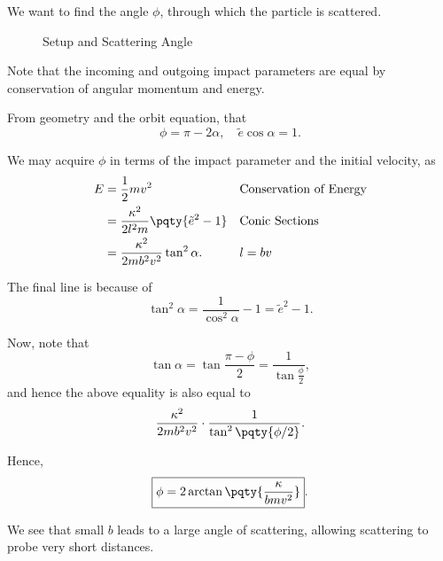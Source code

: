 We want to find the angle \(\phi\), through which the particle is scattered.

\begin{figure}[ht!]
    \centering

    \caption{Setup and Scattering Angle}
    \label{fig:setup-scattering-angle}%
\end{figure}

Note that the incoming and outgoing impact parameters are equal by conservation of angular momentum and energy.

\begin{example}
    \label{ex:angle-of-scattering-repulsive}%
    From geometry and the orbit equation, that
    \begin{equation}
        \phi = \pi - 2\alpha, \quad \tilde{e} \cos \alpha = 1.
    \end{equation}
    
    We may acquire \(\phi\) in terms of the impact parameter and the initial velocity, as
    \begin{subequations}\begin{align}
        E &= \frac{1}{2} m v^2 && \text{Conservation of Energy}\\
        &= \frac{\kappa^2}{2 l^2 m} \pqty{\tilde{e}^2 - 1} && \text{Conic Sections} \\
        &= \frac{\kappa^2}{2 m b^2 v^2} \tan^2 \alpha. && l = bv    
    \end{align}\end{subequations}
    
    The final line is because of
    \begin{equation}
        \tan^2 \alpha = \frac{1}{\cos^2 \alpha} - 1 = \tilde{e}^2 - 1.
    \end{equation}
    
    Now, note that
    \begin{equation}
        \tan \alpha = \tan \frac{\pi - \phi}{2} = \frac{1}{\tan \frac{\phi}{2}},
    \end{equation}
    and hence the above equality is also equal to
    \begin{equation}
        \frac{\kappa^2}{2 m b^2 v^2} \cdot \frac{1}{\tan^2 \pqty{\phi / 2}}.
    \end{equation}
    
    Hence,
    \begin{equation}
        \boxed{\phi = 2 \arctan \pqty{\frac{\kappa}{b m v^2}}}.
    \end{equation}
\end{example}

We see that small \(b\) leads to a large angle of scattering, allowing scattering to probe very short distances.